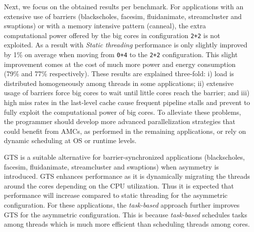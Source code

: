 
Next, we focus on the obtained results per benchmark. 
For applications with an extensive use of barriers (blackscholes, facesim, fluidanimate, streamcluster and swaptions) or with a memory intensive pattern (canneal), the extra computational power offered by the big cores in configuration \texttt{2+2} is not exploited. 
As a result with \emph{Static threading} performance is only slightly improved by 1\% on average when moving from \texttt{0+4} to the \texttt{2+2} configuration. 
This slight improvement comes at the cost of much more power and energy consumption (79\% and 77\% respectively).
These results are explained three-fold: i) load is distributed homogeneously among threads in some 
applications; ii) extensive usage of barriers force big cores to wait until little cores reach the 
barrier; and iii) high miss rates in the last-level cache cause frequent pipeline stalls and prevent 
to fully exploit the computational power of big cores. 
To alleviate these problems, the programmer should develop more advanced parallelization strategies that could benefit from AMCs, as performed in the remaining applications, or rely on dynamic scheduling at OS or runtime levels.

GTS is a suitable alternative for barrier-synchronized applications (blackscholes, facesim, fluidanimate, streamcluster and swaptions) when asymmetry is introduced. 
GTS enhances performance as it is dynamically migrating the threads around the cores depending on the CPU utilization.
Thus it is expected that performance will increase compared to static threading for the asymmetric configuration. 
For these applications, the \emph{task-based} approach further improves GTS for the asymmetric configuration.
This is because \emph{task-based} schedules tasks among threads which is much more efficient than scheduling threads among cores.

